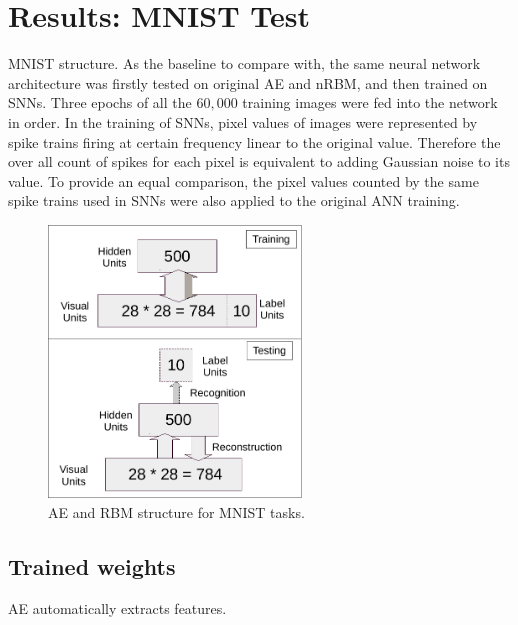 \section{Results: MNIST Test}
MNIST structure.
As the baseline to compare with, the same neural network architecture was firstly tested on original AE and nRBM, and then trained on SNNs.
Three epochs of all the $60,000$ training images were fed into the network in order.
In the training of SNNs, pixel values of images were represented by spike trains firing at certain frequency linear to the original value.
Therefore the over all count of spikes for each pixel is equivalent to adding Gaussian noise to its value.
To provide an equal comparison, the pixel values counted by the same spike trains used in SNNs were also applied to the original ANN training.
\begin{figure}
	\centering
	\includegraphics[width=0.6\textwidth]{pics_sdlm/mnist.pdf}
	\caption{AE and RBM structure for MNIST tasks.}
	\label{fig:MNSIT}
\end{figure}
\subsection{Trained weights}
AE automatically extracts features.


